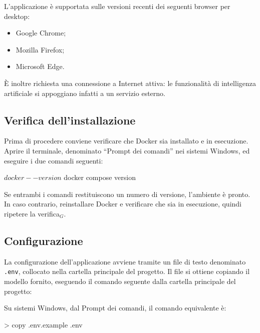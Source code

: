 \documentclass[a4paper, 10pt]{article}
\begin{document}
L'applicazione è supportata sulle versioni recenti dei seguenti browser per desktop:

\begin{itemize}
    \item Google Chrome;

    \item Mozilla Firefox;

    \item Microsoft Edge.
\end{itemize}

È inoltre richiesta una connessione a Internet attiva: le funzionalità di intelligenza artificiale si appoggiano infatti a un servizio esterno.

\subsection{Verifica dell'installazione}
\label{sec:verifica-installazione}
Prima di procedere conviene verificare che Docker sia installato e in esecuzione. Aprire il terminale, denominato ``Prompt dei comandi'' nei sistemi Windows, ed eseguire i due comandi seguenti:

\begin{comando}
$ docker --version
$ docker compose version
\end{comando}

Se entrambi i comandi restituiscono un numero di versione, l'ambiente è pronto. In caso contrario, reinstallare Docker e verificare che sia in esecuzione, quindi ripetere la verifica$_G$.

\subsection{Configurazione}
\label{sec:configurazione}
La configurazione dell'applicazione avviene tramite un file di testo denominato \texttt{.env}, collocato nella cartella principale del progetto. Il file si ottiene copiando il modello fornito, eseguendo il comando seguente dalla cartella principale del progetto:


\noindent Su sistemi Windows, dal Prompt dei comandi, il comando equivalente è:

\begin{comando}
> copy .env.example .env
\end{comando}
\end{document}
